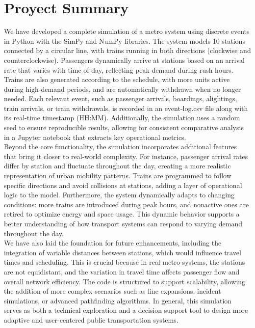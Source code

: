 \documentclass[a4paper,11pt,oneside]{book}
\begin{document}
    \newpage
    \thispagestyle{empty}
    \chapter*{\centering \Large Proyect Summary}


     We have developed a complete simulation of a metro system using discrete events in Python with the SimPy and NumPy libraries. The system models 10 stations connected by a circular line, with trains running in both directions (clockwise and counterclockwise). Passengers dynamically arrive at stations based on an arrival rate that varies with time of day, reflecting peak demand during rush hours. Trains are also generated according to the schedule, with more units active during high-demand periods, and are automatically withdrawn when no longer needed. Each relevant event, such as passenger arrivals, boardings, alightings, train arrivals, or train withdrawals, is recorded in an event-log.csv file along with its real-time timestamp (HH:MM). Additionally, the simulation uses a random seed to ensure reproducible results, allowing for consistent comparative analysis in a Jupyter notebook that extracts key operational metrics. 
    ~\\[0,5cm]
     Beyond the core functionality, the simulation incorporates additional features that bring it closer to real-world complexity. For instance, passenger arrival rates differ by station and fluctuate throughout the day, creating a more realistic representation of urban mobility patterns. Trains are programmed to follow specific directions and avoid collisions at stations, adding a layer of operational logic to the model. Furthermore, the system dynamically adapts to changing conditions: more trains are introduced during peak hours, and nonactive ones are retired to optimize energy and space usage. This dynamic behavior supports a better understanding of how transport systems can respond to varying demand throughout the day. 
     ~\\[0,5cm]
     We have also laid the foundation for future enhancements, including the integration of variable distances between stations, which would influence travel times and scheduling. This is crucial because in real metro systems, the stations are not equidistant, and the variation in travel time affects passenger flow and overall network efficiency. The code is structured to support scalability, allowing the addition of more complex scenarios such as line expansions, incident simulations, or advanced pathfinding algorithms. In general, this simulation serves as both a technical exploration and a decision support tool to design more adaptive and user-centered public transportation systems.\\
     
\end{document}
